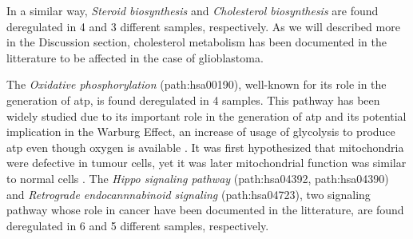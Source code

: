 In a similar way, \textit{Steroid biosynthesis} and \textit{Cholesterol biosynthesis} are found deregulated in 4 and 3 different samples, respectively.
As we will described more in the Discussion section, cholesterol metabolism has been documented in the litterature to be affected in the case of glioblastoma.

The \textit{Oxidative phosphorylation} (path:hsa00190), well-known for its role in the generation of \acrshort{atp}, is found deregulated in 4 samples.
This pathway has been widely studied due to its important role in the generation of \acrshort{atp} and its potential implication in the Warburg Effect, an increase of usage of glycolysis to produce \acrshort{atp} even though oxygen is available \cite*{Spinicci2022}.
It was first hypothesized that mitochondria were defective in tumour cells, yet it was later mitochondrial function was similar to normal cells \cite*{Cairns2011}.
The \textit{Hippo signaling pathway} (path:hsa04392, path:hsa04390) and \textit{Retrograde endocannnabinoid signaling} (path:hsa04723), two signaling pathway whose role in cancer have been documented in the litterature, are found deregulated in 6 and 5 different samples, respectively.


